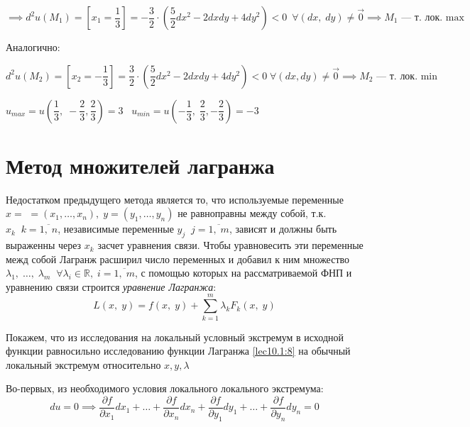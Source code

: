 \documentclass[../../main.tex]{subfiles}
\begin{document}
	\[\implies d^2u\left(M_1\right) = \left[x_1 = \dfrac{1}{3}\right] = 
	-\dfrac{3}{2}\cdot(\dfrac{5}{2}dx^2 - 2dxdy + 4dy^2) < 0\ \; 
	\forall \left(dx, \; dy\right) \neq \vec{0} \implies 
	M_1 \text{~--- т. лок. max}\]
	
	Аналогично:
	
	\[d^2u \left(M_2\right) = \left[x_2 = -\dfrac{1}{3} \right] = 
	\dfrac{3}{2} \cdot \left( \dfrac{5}{2} dx^2 - 2dxdy + 4dy^2\right) < 0 
	\; \forall \left(dx, dy\right) \neq \vec{0} \implies M_2 
	\text{~--- т. лок. min}\]
	
	$u_{max} = u\left(\dfrac{1}{3}, \; -\dfrac{2}{3}, 
	\dfrac{2}{3}\right) = 3 \;\;\; 
	u_{min} = u\left(-\dfrac{1}{3}, \; 
	\dfrac{2}{3}, -\dfrac{2}{3}\right) = -3$ 
	
	\section{Метод множителей лагранжа} 
	
	Недостатком предыдущего метода является то, что используемые переменные 
	$x = $ $=\left(x_1, \ldots, x_n\right), \; y = \left(y_1,\ldots, y_n\right)$
	не равноправны между собой, т.к. $x_k \;\; k = \overline{1,\; n}$, 
	независимые переменные $y_j \;\; j = \overline{1,\; m}$, зависят и 
	должны быть выраженны через $x_k$ засчет уравнения связи. 
	Чтобы уравновесить эти переменные межд собой Лагранж расширил 
	число переменных и добавил к ним множество 
	$\lambda_1,\; \ldots,\; \lambda_m \;\; \forall 
	\lambda_i \in \mathbb{R}, \; i = \overline{1,\; m}$, 
	с помощью которых на рассматриваемой ФНП и уравнению 
	связи строится \emph{уравнение Лагранжа}:
	\begin{equation}
	L\left(x, \; y\right) = f\left(x, \; y\right) + \sum\limits_{k = 1}^m 
	\lambda_k F_k\left(x, \; y\right) \label{lec10.1:8}
	\end{equation}
	
	
	Покажем, что из исследования на локальный условный экстремум в исходной 
	функции равносильно исследованию функции Лагранжа 
	\eqref{lec10.1:8} на обычный локальный экстремум относительно $x, y,\lambda$
	
	Во-первых, из необходимого условия локального локального экстремума:
	\begin{equation}
	du = 0 \implies \dfrac{\partial f}{\partial x_1} dx_1 + \ldots + 
	\dfrac{\partial f}{\partial x_n} dx_n + \dfrac{\partial f}{\partial y_1}dy_1
	 + \ldots + \dfrac{\partial f}{\partial y_n} dy_n = 0 \label{lec10.1:9}
	\end{equation}
	
\end{document}
